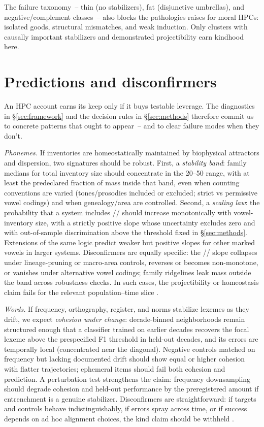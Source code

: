 \documentclass[12pt]{article}
\begin{document}
The failure taxonomy~-- thin (no stabilizers), fat (disjunctive umbrellas), and  negative/complement classes~-- also blocks the pathologies \citet{Rubin2008} raises for  moral HPCs: isolated goods, structural mismatches, and weak induction. Only  clusters with causally important stabilizers and demonstrated projectibility  earn kindhood here.


\section{Predictions and disconfirmers}\label{sec:predictions}

An \textsc{HPC} account earns its keep only if it buys testable leverage. The diagnostics in \S\ref{sec:framework} and the decision rules in \S\ref{sec:methods} therefore commit us to concrete patterns that ought to appear~-- and to clear failure modes when they don't.

\emph{Phonemes.} If inventories are homeostatically maintained by biophysical attractors and dispersion, two signatures should be robust. First, a \emph{stability band}: family medians for total inventory size should concentrate in the 20–50 range, with at least the predeclared fraction of mass inside that band, even when counting conventions are varied (tones/prosodies included or excluded; strict vs permissive vowel codings) and when genealogy/area are controlled. Second, a \emph{scaling law}: the probability that a system includes // should increase monotonically with vowel-inventory size, with a strictly positive slope whose uncertainty excludes zero and with out-of-sample discrimination above the threshold fixed in \S\ref{sec:methods}. Extensions of the same logic predict weaker but positive slopes for other marked vowels in larger systems. Disconfirmers are equally specific: the // slope collapses under lineage-pruning or macro-area controls, reverses or becomes non-monotone, or vanishes under alternative vowel codings; family ridgelines leak mass outside the band across robustness checks. In such cases, the projectibility or homeostasis claim fails for the relevant population–time slice \citep{Ekstrom2025PhonemeTool,Stevens1989Quantal,LiljencrantsLindblom1972,Lindblom1990HandH}.

\emph{Words.} If frequency, orthography, register, and norms stabilize lexemes as they drift, we expect \emph{cohesion under change}: decade-binned neighborhoods remain structured enough that a classifier trained on earlier decades recovers the focal lexeme above the prespecified F1 threshold in held-out decades, and its errors are temporally local (concentrated near the diagonal). Negative controls matched on frequency but lacking documented drift should show equal or higher cohesion with flatter trajectories; ephemeral items should fail both cohesion and prediction. A perturbation test strengthens the claim: frequency downsampling should degrade cohesion and held-out performance by the preregistered amount if entrenchment is a genuine stabilizer. Disconfirmers are straightforward: if targets and controls behave indistinguishably, if errors spray across time, or if success depends on ad hoc alignment choices, the kind claim should be withheld \citep{Miller2021WordsSpeciesKinds,HamiltonEtAl2016}.
\end{document}
